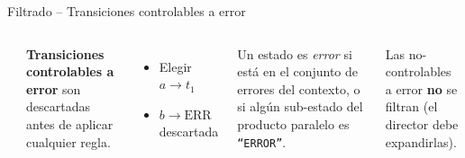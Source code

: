 \documentclass{beamer}
\begin{document}
\begin{frame}{Filtrado -- Transiciones controlables a error}
\begin{columns}[c]
\begin{center}
\end{center}

\textbf{Transiciones controlables a error} son descartadas antes de aplicar cualquier regla.

\medskip
\begin{itemize}
  \item[\textcolor{cChosen}{$\blacktriangleright$}] Elegir $a \to t_1$
  \item[\textcolor{cError}{$\times$}] $b \to \text{ERR}$ descartada
\end{itemize}

\medskip
{\small Un estado es \emph{error} si est\'a en el conjunto de errores del contexto, o si alg\'un sub-estado del producto paralelo es \texttt{``ERROR''}.}

\medskip
{\small Las no-controlables a error \textbf{no} se filtran (el director debe expandirlas).}
\end{columns}
\end{frame}
\end{document}
